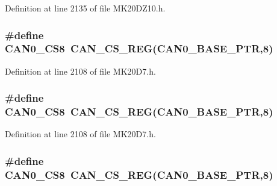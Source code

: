 Definition at line 2135 of file M\+K20\+D\+Z10.\+h.

\subsubsection[{\texorpdfstring{C\+A\+N0\+\_\+\+C\+S8}{CAN0_CS8}}]{\setlength{\rightskip}{0pt plus 5cm}\#define C\+A\+N0\+\_\+\+C\+S8~{\bf C\+A\+N\+\_\+\+C\+S\+\_\+\+R\+EG}({\bf C\+A\+N0\+\_\+\+B\+A\+S\+E\+\_\+\+P\+TR},8)}\hypertarget{group___c_a_n___register___accessor___macros_ga09270fe534bb30d9475211ebd6675af5}{}\label{group___c_a_n___register___accessor___macros_ga09270fe534bb30d9475211ebd6675af5}


Definition at line 2108 of file M\+K20\+D7.\+h.

\subsubsection[{\texorpdfstring{C\+A\+N0\+\_\+\+C\+S8}{CAN0_CS8}}]{\setlength{\rightskip}{0pt plus 5cm}\#define C\+A\+N0\+\_\+\+C\+S8~{\bf C\+A\+N\+\_\+\+C\+S\+\_\+\+R\+EG}({\bf C\+A\+N0\+\_\+\+B\+A\+S\+E\+\_\+\+P\+TR},8)}\hypertarget{group___c_a_n___register___accessor___macros_ga09270fe534bb30d9475211ebd6675af5}{}\label{group___c_a_n___register___accessor___macros_ga09270fe534bb30d9475211ebd6675af5}


Definition at line 2108 of file M\+K20\+D7.\+h.

\subsubsection[{\texorpdfstring{C\+A\+N0\+\_\+\+C\+S8}{CAN0_CS8}}]{\setlength{\rightskip}{0pt plus 5cm}\#define C\+A\+N0\+\_\+\+C\+S8~{\bf C\+A\+N\+\_\+\+C\+S\+\_\+\+R\+EG}({\bf C\+A\+N0\+\_\+\+B\+A\+S\+E\+\_\+\+P\+TR},8)}\hypertarget{group___c_a_n___register___accessor___macros_ga09270fe534bb30d9475211ebd6675af5}{}\label{group___c_a_n___register___accessor___macros_ga09270fe534bb30d9475211ebd6675af5}


